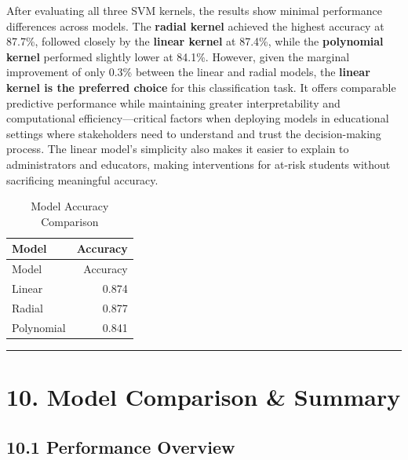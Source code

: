 \documentclass[
]{article}
\begin{document}
After evaluating all three SVM kernels, the results show minimal
performance differences across models. The \textbf{radial kernel}
achieved the highest accuracy at 87.7\%, followed closely by the
\textbf{linear kernel} at 87.4\%, while the \textbf{polynomial kernel}
performed slightly lower at 84.1\%. However, given the marginal
improvement of only 0.3\% between the linear and radial models, the
\textbf{linear kernel is the preferred choice} for this classification
task. It offers comparable predictive performance while maintaining
greater interpretability and computational efficiency---critical factors
when deploying models in educational settings where stakeholders need to
understand and trust the decision-making process. The linear model's
simplicity also makes it easier to explain to administrators and
educators, making interventions for at-risk students without sacrificing
meaningful accuracy.

\begin{longtable}[]{@{}lr@{}}
\caption{Model Accuracy Comparison}\tabularnewline
\toprule\noalign{}
Model & Accuracy \\
\midrule\noalign{}
\endfirsthead
\toprule\noalign{}
Model & Accuracy \\
\midrule\noalign{}
\endhead
\bottomrule\noalign{}
\endlastfoot
Linear & 0.874 \\
Radial & 0.877 \\
Polynomial & 0.841 \\
\end{longtable}

\begin{center}\rule{0.5\linewidth}{0.5pt}\end{center}

\section{10. Model Comparison \&
Summary}\label{model-comparison-summary}

\subsection{10.1 Performance Overview}\label{performance-overview}
\end{document}
